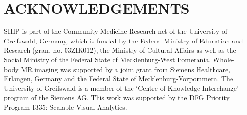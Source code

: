 \documentclass[a4paper,twoside]{style/article}
\begin{document}
\section*{\uppercase{Acknowledgements}}
\begin{small}
\noindent SHIP is part of the Community Medicine Research net of the University of Greifswald, Germany, which is funded by the Federal Ministry of Education and Research (grant no. 03ZIK012), the Ministry of Cultural Affairs as well as the Social Ministry of the Federal State of Mecklenburg-West Pomerania. Whole-body MR imaging was supported by a joint grant from Siemens Healthcare, Erlangen, Germany and the Federal State of Mecklenburg-Vorpommern. The University of Greifswald is a member of the ‘Centre of Knowledge Interchange’ program of the Siemens AG. This work was supported by the DFG Priority Program 1335: Scalable Visual Analytics.
\end{small}



{\small
}


\vfill
\end{document}
